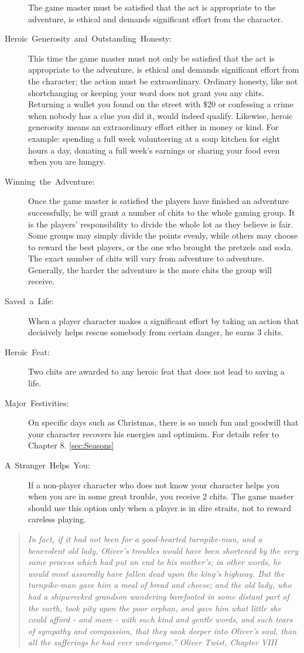 \begin{description}
The game master must be satisfied that the act is appropriate to the
adventure, is ethical and demands significant effort from the character.
\item [{Heroic~Generosity~and~Outstanding~Honesty:}] This time the
game master must not only be satisfied that the act is appropriate
to the adventure, is ethical and demands significant effort from the
character; the action must be extraordinary. Ordinary honesty, like
not shortchanging or keeping your word does not grant you any chits.
Returning a wallet you found on the street with \$20 or confessing
a crime when nobody has a clue you did it, would indeed qualify. Likewise,
heroic generosity means an extraordinary effort either in money or
kind. For example: spending a full week volunteering at a soup kitchen
for eight hours a day, donating a full week's earnings or sharing
your food even when you are hungry.
\item [{Winning~the~Adventure:}] Once the game master is satisfied the
players have finished an adventure successfully, he will grant a number
of chits to the whole gaming group. It is the players' responsibility
to divide the whole lot as they believe is fair. Some groups may simply
divide the points evenly, while others may choose to reward the best
players, or the one who brought the pretzels and soda. The exact number
of chits will vary from adventure to adventure. Generally, the harder
the adventure is the more chits the group will receive.
\item [{Saved~a~Life:}] When a player character makes a significant effort
by taking an action that decisively helps rescue somebody from certain
danger, he earns 3 chits.
\item [{Heroic~Feat:}] Two chits are awarded to any heroic feat that does
not lead to saving a life.
\item [{Major~Festivities:}] On specific days such as Christmas, there
is so much fun and goodwill that your character recovers his energies
and optimism. For details refer to Chapter 8. \ref{sec:Seasons}
\item [{A~Stranger~Helps~You:}] If a non-player character who does not
know your character helps you when you are in some great trouble,
you receive 2 chits. The game master should use this option only when
a player is in dire straits, not to reward careless playing.\end{description}
\begin{quote}
\emph{\textquotedbl{}In fact, if it had not been for a good-hearted
turnpike-man, and a benevolent old lady, Oliver's troubles would have
been shortened by the very same process which had put an end to his
mother's; in other words, he would most assuredly have fallen dead
upon the king's highway. But the turnpike-man gave him a meal of bread
and cheese; and the old lady, who had a shipwrecked grandson wandering
barefooted in some distant part of the earth, took pity upon the poor
orphan, and gave him what little she could afford - and more - with
such kind and gentle words, and such tears of sympathy and compassion,
that they sank deeper into Oliver's soul, than all the sufferings
he had ever undergone.'' Oliver Twist, Chapter VIII}
\end{quote}

